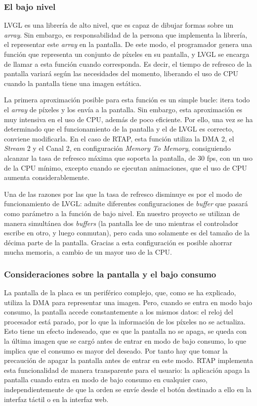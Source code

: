 \subsubsection{El bajo nivel}
\label{subsubsec:bajo-nivel}
LVGL es una librería de alto nivel, que es capaz de dibujar formas sobre un \textit{array}. Sin embargo, es responsabilidad de la persona que implementa la librería, el representar este \textit{array} en la pantalla. De este modo, el programador genera una función que representa un conjunto de píxeles en su pantalla, y LVGL se encarga de llamar a esta función cuando corresponda. Es decir, el tiempo de refresco de la pantalla variará según las necesidades del momento, liberando el uso de CPU cuando la pantalla tiene una imagen estática.

La primera aproximación posible para esta función es un simple bucle: itera todo el \textit{array} de píxeles y los envía a la pantalla. Sin embargo, esta aproximación es muy intensiva en el uso de CPU, además de poco eficiente. Por ello, una vez se ha determinado que el funcionamiento de la pantalla y el de LVGL es correcto, conviene modificarla. En el caso de RTAP, esta función utiliza la DMA 2, el \textit{Stream} 2 y el Canal 2, en configuración \textit{Memory To Memory}, consiguiendo alcanzar la tasa de refresco máxima que soporta la pantalla, de 30 fps, con un uso de la CPU mínimo, excepto cuando se ejecutan animaciones, que el uso de CPU aumenta considerablemente.

Una de las razones por las que la tasa de refresco disminuye es por el modo de funcionamiento de LVGL: admite diferentes configuraciones de \textit{buffer} que pasará como parámetro a la función de bajo nivel. En nuestro proyecto se utilizan de manera simultánea dos \textit{buffers} (la pantalla lee de uno mientras el controlador escribe en otro, y luego conmutan), pero cada uno solamente es del tamaño de la décima parte de la pantalla. Gracias a esta configuración es posible ahorrar mucha memoria, a cambio de un mayor uso de la CPU.

\subsubsection{Consideraciones sobre la pantalla y el bajo consumo}
\label{subsubsec:apagar-pantalla}
La pantalla de la placa es un periférico complejo, que, como se ha explicado, utiliza la DMA para representar una imagen. Pero, cuando se entra en modo bajo consumo, la pantalla accede constantemente a los mismos datos: el reloj del procesador está parado, por lo que la información de los píxeles no se actualiza. Esto tiene un efecto indeseado, que es que la pantalla no se apaga, se queda con la última imagen que se cargó antes de entrar en modo de bajo consumo, lo que implica que el consumo es mayor del deseado. Por tanto hay que tomar la precaución de apagar la pantalla antes de entrar en este modo. RTAP implementa esta funcionalidad de manera transparente para el usuario: la aplicación apaga la pantalla cuando entra en modo de bajo consumo en cualquier caso, independientemente de que la orden se envíe desde el botón destinado a ello en la interfaz táctil o en la interfaz web.

